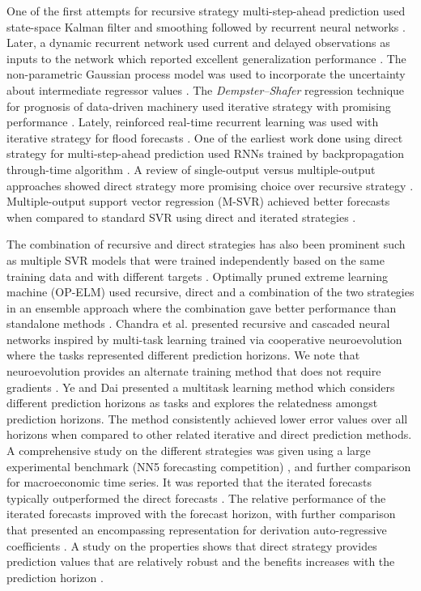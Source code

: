 \documentclass{ieeeaccess}
\begin{document}
One of the first attempts for  recursive strategy multi-step-ahead prediction used state-space Kalman filter and smoothing      \cite{ng1990recursive} followed by  recurrent neural 
networks  \cite{Su1992}.  Later,   a dynamic recurrent network used current and delayed  observations  as inputs
to the network which reported   
excellent generalization performance  
\cite{Parlos2000}. The
non-parametric Gaussian process model was used to   incorporate the uncertainty about intermediate regressor 
values \cite{BeckerNIPS2002}.  The \textit{Dempster–Shafer} regression technique  for  prognosis of data-driven machinery used iterative strategy      with promising 
performance \cite{Niu2009}.   Lately, reinforced real-time recurrent learning  was used with iterative strategy for  flood forecasts  
\cite{chang2012reinforced}.  One of the earliest work \textcolor{black}{done} using direct strategy for multi-step-ahead prediction used  RNNs trained by backpropagation through-time 
algorithm \cite{bone2002multi}. A  review of single-output versus multiple-output 
approaches  showed  direct strategy 
more  promising choice over recursive strategy  \cite{BenTaieb2010}.    Multiple-output support vector regression (M-SVR)   achieved  
better  forecasts  when compared to   standard SVR using direct 
and iterated strategies \cite{Bao2014}. 
  
The  combination of recursive and direct strategies has also been prominent such as multiple SVR   models  that were trained 
independently 
based on the same training data and with different
targets \cite{zhang2013iterated}. Optimally pruned 
extreme learning machine (OP-ELM) used 
recursive, direct and a combination of the two strategies in an ensemble 
approach where the combination   gave better 
performance than  standalone methods \cite{Grigorievskiy2014}. Chandra et al. \cite{chandra2017CMTLMulti} presented recursive and cascaded neural networks inspired by multi-task learning  trained via cooperative neuroevolution where the tasks represented different prediction horizons. We note that neuroevolution provides an alternate training method that does not require gradients \cite{rawal2016evolving}. 
Ye and Dai \cite{YE2019227} presented a multitask learning method  which considers different prediction  horizons as  tasks and explores the relatedness amongst prediction horizons. The method consistently achieved lower error values over all horizons when compared to other related  iterative and direct prediction methods. 
A  comprehensive study on  the  different strategies was given
using a large experimental
benchmark (NN5 forecasting competition) \cite{taieb2012review}, and further comparison for  macroeconomic time series. It 
was reported that the  iterated forecasts
typically outperformed the direct forecasts \cite{marcellino2006}. The relative performance of the iterated forecasts improved with the
forecast horizon, with further  comparison that  presented  an encompassing 
representation for  derivation  auto-regressive coefficients  
 \cite{Proietti2011}. A study on the properties  
shows that direct strategy provides prediction values that are relatively robust  and the benefits increases with the prediction horizon \cite{Chevillon2016}.
 
\end{document}
